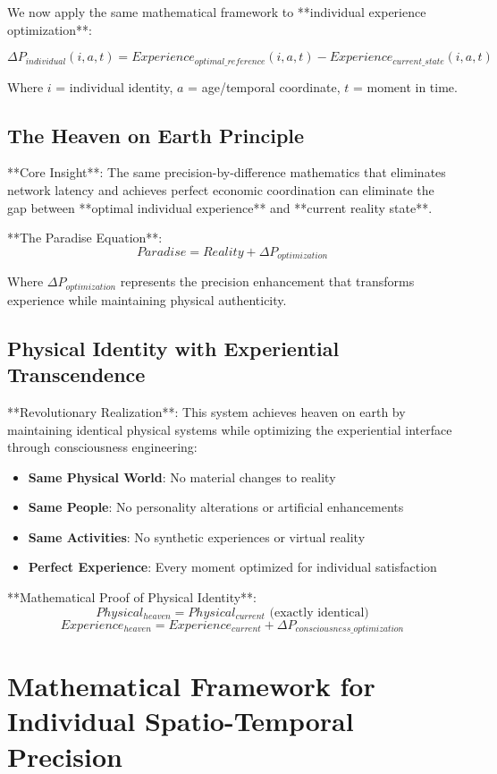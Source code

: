 \documentclass[12pt,a4paper]{article}
\begin{document}
We now apply the same mathematical framework to **individual experience optimization**:

$$\Delta P_{individual}(i,a,t) = Experience_{optimal\_reference}(i,a,t) - Experience_{current\_state}(i,a,t)$$

Where $i$ = individual identity, $a$ = age/temporal coordinate, $t$ = moment in time.

\subsection{The Heaven on Earth Principle}

**Core Insight**: The same precision-by-difference mathematics that eliminates network latency and achieves perfect economic coordination can eliminate the gap between **optimal individual experience** and **current reality state**.

**The Paradise Equation**:
$$Paradise = Reality + \Delta P_{optimization}$$

Where $\Delta P_{optimization}$ represents the precision enhancement that transforms experience while maintaining physical authenticity.

\subsection{Physical Identity with Experiential Transcendence}

**Revolutionary Realization**: This system achieves heaven on earth by maintaining identical physical systems while optimizing the experiential interface through consciousness engineering:

\begin{itemize}
\item \textbf{Same Physical World}: No material changes to reality
\item \textbf{Same People}: No personality alterations or artificial enhancements
\item \textbf{Same Activities}: No synthetic experiences or virtual reality
\item \textbf{Perfect Experience}: Every moment optimized for individual satisfaction
\end{itemize}

**Mathematical Proof of Physical Identity**:
$$Physical_{heaven} = Physical_{current} \text{ (exactly identical)}$$
$$Experience_{heaven} = Experience_{current} + \Delta P_{consciousness\_optimization}$$

\section{Mathematical Framework for Individual Spatio-Temporal Precision}
\end{document}

